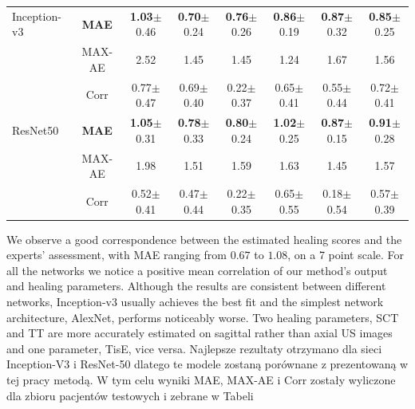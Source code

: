 \begin{table}[h]
\begin{tabular}{lc||c|c|c|c|c|c}
		Inception-v3 & \textbf{MAE} & \textbf{1.03}$\pm$0.46 & \textbf{0.70}$\pm$0.24 & \textbf{0.76}$\pm$0.26 & \textbf{0.86}$\pm$0.19 & \textbf{0.87}$\pm$0.32 & \textbf{0.85}$\pm$0.25  \\
		& MAX-AE & 2.52 & 1.45 & 1.45 & 1.24 & 1.67 & 1.56 \\ 
		& Corr & 0.77$\pm${0.47} & 0.69$\pm${0.40} & 0.22$\pm${0.37} & 0.65$\pm${0.41} & 0.55$\pm${0.44} & 0.72$\pm${0.41} \\ \hline
		ResNet50 & \textbf{MAE} & \textbf{1.05}$\pm$0.31 & \textbf{0.78}$\pm$0.33 & \textbf{0.80}$\pm$0.24 & \textbf{1.02}$\pm$0.25 & \textbf{0.87}$\pm$0.15 & \textbf{0.91}$\pm$0.28 \\
		& MAX-AE & 1.98 & 1.51 & 1.59 & 1.63 & 1.45 & 1.57 \\
		& Corr & 0.52$\pm${0.41} & 0.47$\pm${0.44} & 0.22$\pm${0.35} & 0.65$\pm${0.55} & 0.18$\pm${0.54} & 0.57$\pm${0.39} \\ \hline \hline
	\end{tabular}
	\vspace{-0.5cm}
\end{table}

We observe a good correspondence between the estimated healing scores and the experts' assessment, with MAE ranging from $0.67$ to $1.08$, on a 7 point scale. For all the networks we notice a positive mean correlation of our method's output and healing parameters. Although the results are consistent between different networks, Inception-v3 usually achieves the best fit and the simplest network architecture, AlexNet, performs noticeably worse. Two healing parameters, SCT and TT are more accurately estimated on sagittal rather than axial US images and one parameter, TisE, vice versa. Najlepsze rezultaty otrzymano dla sieci Inception-V3 i ResNet-50 dlatego te modele zostaną porównane z prezentowaną w tej pracy metodą. W tym celu wyniki MAE, MAX-AE i Corr zostały wyliczone dla zbioru pacjentów testowych i zebrane w Tabeli 


